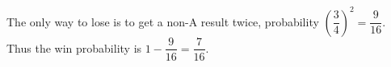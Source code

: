 The only way to lose is to get a non-A result twice, probability $(\dfrac{3}{4})^2=\dfrac{9}{16}$. Thus the win probability is $1-\dfrac{9}{16}=\boxed{\dfrac{7}{16}}$.
